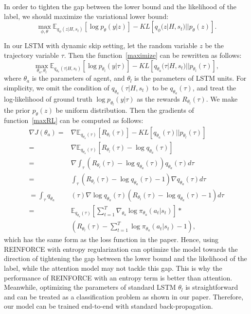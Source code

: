 \documentclass[letterpaper]{article} \usepackage{aaai19}  \usepackage{times}  \usepackage{helvet}  \usepackage{courier}  \usepackage{url}  \usepackage{graphicx}  \usepackage{amsmath}
\begin{document}
In order to tighten the gap between the lower bound and the likelihood of the label, we should maximize the variational lower bound:
\begin{equation}
\max_{\phi,\theta} \mathbb{E}_{q_\phi(z|H,s_t)}[\log p_\theta(y|z)]-KL[q_\phi(z|H,s_t)||p_\theta(z)].
\label{maximize}
\end{equation}

In our LSTM with dynamic skip setting, let the random variable $z$ be the trajectory variable $\tau$. Then the function~\ref{maximize} can be rewritten as follows:
\begin{equation}
\max_{\theta_a,\theta_l} \mathbb{E}_{q_{\theta_a}(\tau|H,s_t)}[\log p_{\theta_l}(y|\tau)]-KL[q_{\theta_a}(\tau|H,s_t)||p_{\theta_l}(\tau)],
\label{maxRL}
\end{equation}
where $\theta_a$ is the parameters of agent, and $\theta_l$ is the parameters of LSTM units. For simplicity, we omit the condition of $q_{\theta_a}(\tau|H,s_t)$ to be $q_{\theta_a}(\tau)$, and treat the log-likelihood of ground truth $\log p_{\theta_l}(y|\tau)$ as the rewards $R_{\theta_l}(\tau)$. We make the prior $p_\theta(z)$ be uniform distribution. Then the gradients of function~\ref{maxRL} can be computed as follows:
\begin{equation}
\begin{aligned}
\nabla J(\theta_a) = & \nabla \mathbb{E}_{q_{\theta_a}(\tau)}[R_{\theta_l}(\tau)]-KL[q_{\theta_a}(\tau)||p_{\theta_l}(\tau)] \\
= & \nabla \mathbb{E}_{q_{\theta_a}(\tau)}[R_{\theta_l}(\tau) - \log q_{\theta_a}(\tau)] \\
= & \nabla \int_\tau (R_{\theta_l}(\tau) - \log q_{\theta_a}(\tau))q_{\theta_a}(\tau)d\tau \\
= & \int_\tau (R_{\theta_l}(\tau) - \log q_{\theta_a}(\tau) -1)\nabla q_{\theta_a}(\tau)d\tau \\
=  \int_\tau q_{\theta_a}&(\tau)\nabla\log q_{\theta_a}(\tau)(R_{\theta_l}(\tau) - \log q_{\theta_a}(\tau) -1)d\tau \\
=& \mathbb{E}_{q_{\theta_a}(\tau)}[\sum_{t=1}^T\nabla_{\theta_a}\log\pi_{\theta_a}(a_t|s_t)]* \\
& (R_{\theta_l}(\tau)-\sum_{t=1}^T\log\pi_{\theta_a}(a_t|s_t)-1),
\end{aligned}
\end{equation}
which has the same form as the loss function in the paper. Hence, using REINFORCE with entropy regularization can optimize the model towards the direction of tightening the gap between the lower bound and the likelihood of the label, while the attention model may not tackle this gap. This is why the performance of REINFORCE with an entropy term is better than attention. Meanwhile, optimizing the parameters of standard LSTM $\theta_l$ is straightforward and can be treated as a classification problem as shown in our paper. Therefore, our model can be trained end-to-end with standard back-propagation.



\end{document}
